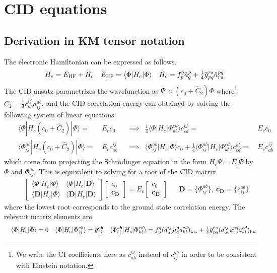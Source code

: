 \documentclass[11pt,fleqn]{article}
\newcommand{\F}{\Phi}        %
\newcommand{\Y}{\Psi}        %
\newcommand{\tl}{\ensuremath{\tilde}}
\newcommand{\ol}[1]{\ensuremath{\overline{#1}}}
\newcommand{\op}[1]{\ensuremath{\hat{#1}}}
\newcommand{\bo}[1]{\ensuremath{\mathbf{#1}}}
\newcommand{\ip}[1]{\ensuremath{\langle#1\rangle}}
\newcommand{\ma}[1]{\ensuremath{\begin{bmatrix}#1\end{bmatrix}}}
\theoremstyle{mystyle}
\begin{document}
\section*{CID equations}

\subsection*{Derivation in KM tensor notation}

The electronic Hamiltonian can be expressed as follows.
\begin{align}
&&
  H_e
=
  E_{\text{HF}}
+
  H_c
&&
  E_{\text{HF}}
=
  \ip{\F|H_e|\F}
&&
  H_c
=
  f_p^q
  \tl{a}_q^p
+
  \tfrac{1}{4}
  \ol{g}_{pq}^{rs}
  \tl{a}_{rs}^{pq}
\end{align}
The CID ansatz parametrizes the wavefunction as $\Y\approx(c_0+\op{C}_2)\F$ where\footnote{We write the CI coefficients here as $c_{ab}^{ij}$ instead of $c_{ij}^{ab}$ in order to be consistent with Einstein notation.} $\op{C}_2=\tfrac{1}{4}c_{ab}^{ij}a_{ij}^{ab}$, and the CID correlation energy can obtained by solving the following system of linear equations
\begin{align}
\label{cid-linear-equations-1}
&&
  \ip{\F|H_c(c_0+\op{C}_2)|\F}
=&\
  E_cc_0
&&
  \implies
&
  \tfrac{1}{4}
  \ip{\F|H_c|\F_{kl}^{cd}}c_{cd}^{kl}
=&\
  E_cc_0
\\
\label{cid-linear-equations-2}
&&
  \ip{\F_{ij}^{ab}|H_c(c_0+\op{C}_2)|\F}
=&\
  E_cc_{ab}^{ij}
&&
  \implies
&
  \ip{\F_{ij}^{ab}|H_c|\F}c_0
+
  \tfrac{1}{4}
  \ip{\F_{ij}^{ab}|H_c|\F_{kl}^{cd}}c_{cd}^{kl}
=&\
  E_cc_{ab}^{ij}
\end{align}
which come from projecting the Schr\"odinger equation in the form $H_c\Y=E_c\Y$ by $\F$ and $\F_{ij}^{ab}$.
This is equivalent to solving for a root of the CID matrix
\begin{align}
&&
  \ma{
    \ip{\F|H_c|\F}&\ip{\F|H_c|\bo{D}}\\
    \ip{\bo{D}|H_c|\F}&\ip{\bo{D}|H_c|\bo{D}}
  }
  \ma{c_0\\\bo{c}_{\bo{D}}}
=
  E_c
  \ma{c_0\\\bo{c}_{\bo{D}}}
&&
  \bo{D}=\{\F_{ij}^{ab}\}, \ 
  \bo{c}_{\bo{D}}=\{c_{ij}^{ab}\}
\end{align}
where the lowest root corresponds to the ground state correlation energy.
The relevant matrix elements are
\begin{align}
\label{cid-matrix-elements}
&&
  \ip{\F|H_c|\F}
=
  0
&&
  \ip{\F|H_c|\F_{ij}^{ab}}
=
  \ol{g}_{ij}^{ab}
&&
  \ip{\F_{ij}^{ab}|H_c|\F_{kl}^{cd}}
=
  f_p^q
  (\tl{a}_{ab}^{ij}\tl{a}_q^p\tl{a}_{kl}^{cd})_{\text{f.c.}}
+
  \tfrac{1}{4}
  \ol{g}_{pq}^{rs}
  (\tl{a}_{ab}^{ij}\tl{a}_{rs}^{pq}\tl{a}_{kl}^{cd})_{\text{f.c.}}
\end{align}
\end{document}
